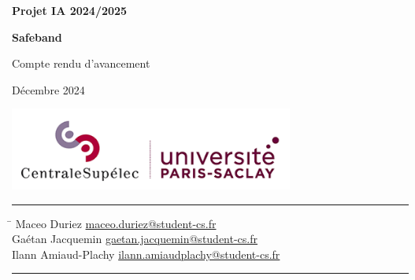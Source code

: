 


\begin{titlepage}
    \begin{center}
        \vspace*{1cm}
        
        \Huge
        \textbf{Projet IA 2024/2025}
        
        \vspace{1.5cm}
        
        \LARGE
        \textbf{Safeband}
        
        \vspace{0.5cm}
        
        \Large
        Compte rendu d'avancement
        
        \vspace{0.5cm}
        
        \large
        Décembre 2024
        
        \vspace{1.5cm}
        
        \includegraphics[width=0.7\textwidth]{logos/centraleSupelec.png}
        
        \vfill
        
        \hrule
        
        \vspace{0.5cm}
        
        \large
        \begin{tabbing}
            \hspace{7cm} \= \hspace{8cm} \kill
            Maceo Duriez \> \href{mailto:maceo.duriez@student-cs.fr}{maceo.duriez@student-cs.fr} \\
            Gaétan Jacquemin \> \href{mailto:gaetan.jacquemin@student-cs.fr}{gaetan.jacquemin@student-cs.fr} \\
            Ilann Amiaud-Plachy \> \href{mailto:ilann.amiaudplachy@student-cs.fr}{ilann.amiaudplachy@student-cs.fr}
        \end{tabbing}
        
        \vspace{0.5cm}
        
        \hrule
        
    \end{center}
\end{titlepage}


